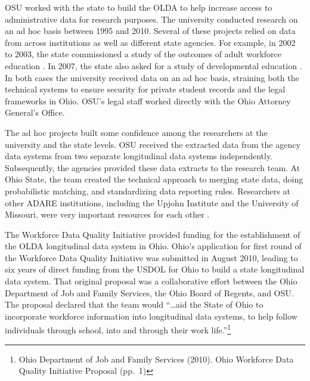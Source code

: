 OSU worked with the state to build the OLDA to help increase access to administrative data for research purposes. The university conducted research on an ad hoc basis between 1995 and 2010. Several of these projects relied on data from across institutions as well as different state agencies. For example, in 2002 to 2003, the state commissioned a study of the outcomes of adult workforce education \citep{hawley2003, hawley2003a, hawley2005}. In 2007, the state also asked for a study of developmental education \citep{hawley2013, hawley2017}. In both cases the university received data on an ad hoc basis, straining both the technical systems to ensure security for private student records and the legal frameworks in Ohio. OSU's legal staff worked directly with the Ohio Attorney General's Office.

The ad hoc projects built some confidence among the researchers at the university and the state levels. OSU received the extracted data from the agency data systems from two separate longitudinal data systems independently. Subsequently, the agencies provided these data extracts to the research team. At Ohio State, the team created the technical approach to merging state data, doing probabilistic matching, and standardizing data reporting rules. Researchers at other ADARE institutions, including the Upjohn Institute and the University of Missouri, were very important resources for each other \citep{stevens2012}.

The Workforce Data Quality Initiative provided funding for the establishment of the OLDA longitudinal data system in Ohio. Ohio's application for first round of the Workforce Data Quality Initiative was submitted in August 2010, leading to six years of direct funding from the USDOL for Ohio to build a state longitudinal data system. That original proposal was a collaborative effort between the Ohio Department of Job and Family Services, the Ohio Board of Regents, and OSU. The proposal declared that the team would ``\ldots{}aid the State of Ohio to incorporate workforce information into longitudinal data systems, to help follow individuals through school, into and through their work life.''\footnote{Ohio Department of Job and Family Services (2010). Ohio Workforce Data Quality Initiative Proposal (pp.~1)}

